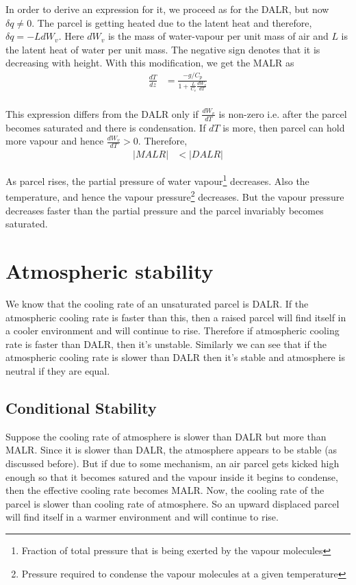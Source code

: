 \documentclass[11pt,a4paper]{article}
\begin{document}
In order to derive an expression for it, we proceed as for the DALR, but now $\delta q \neq 0$. The parcel is getting heated due to the latent heat and therefore, $\delta q = -L dW_v$. Here $dW_v$ is the mass of water-vapour per unit mass of air and $L$ is the latent heat of water per unit mass. The negative sign denotes that it is decreasing with height. With this modification, we get the MALR as
\begin{align*}
\frac{dT}{dz} &= \frac{-g/C_p}{1+\frac{L}{C_v}\frac{dW_v}{dT}}\\
\end{align*}

This expression differs from the DALR only if $\frac{dW_v}{dT}$ is non-zero i.e. after the parcel becomes saturated and there is condensation. If $dT$ is more, then parcel can hold more vapour and hence $\frac{dW_v}{dT} > 0$. Therefore,
\begin{align*}
|MALR| &<|DALR|
\end{align*}

As parcel rises, the partial pressure of water vapour\footnote{Fraction of total pressure that is being exerted by the vapour molecules} decreases. Also the temperature, and hence the vapour pressure\footnote{Pressure required to condense the vapour molecules at a given temperature} decreases. But the vapour pressure decreases faster than the partial pressure and the parcel invariably becomes saturated.

\section{Atmospheric stability}

We know that the cooling rate of an unsaturated parcel is DALR. If the atmospheric cooling rate is faster than this, then a raised parcel will find itself in a cooler environment and will continue to rise. Therefore if atmospheric cooling rate is faster than DALR, then it's unstable. Similarly we can see that if the atmospheric cooling rate is slower than DALR then it's stable and atmosphere is neutral if they are equal.

\subsection{Conditional Stability}

Suppose the cooling rate of atmosphere is slower than DALR but more than MALR. Since it is slower than DALR, the atmosphere appears to be stable (as discussed before). But if due to some mechanism, an air parcel gets kicked high enough so that it becomes satured and the vapour inside it begins to condense, then the effective cooling rate becomes MALR. Now, the cooling rate of the parcel is slower than cooling rate of atmosphere. So an upward displaced parcel will find itself in a warmer environment and will continue to rise.
\end{document}
